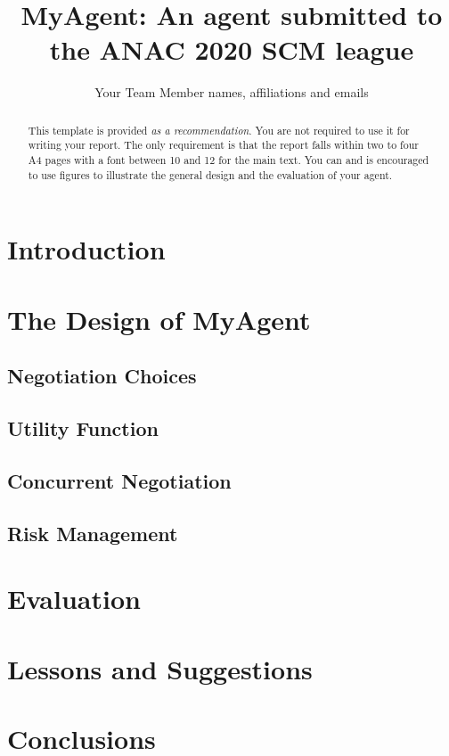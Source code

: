 \documentclass{article}
\title{MyAgent: An agent submitted to the ANAC 2020 SCM league}
\author{Your Team Member names, affiliations and emails}
\begin{document}
\maketitle
\begin{abstract}
    This template is provided \emph{as a recommendation}. You are not required 
    to use it for writing your report. The only requirement is that the report 
    falls within two to four A4 pages with a font between 10 and 12 for the main
    text. You can and is encouraged to use figures to illustrate the general 
    design and the evaluation of your agent. 
\end{abstract}
\section{Introduction}
\section{The Design of MyAgent}
\subsection{Negotiation Choices}
\subsection{Utility Function}
\subsection{Concurrent Negotiation}
\subsection{Risk Management}
\section{Evaluation}
\section{Lessons and Suggestions}
\section*{Conclusions}
\end{document}
